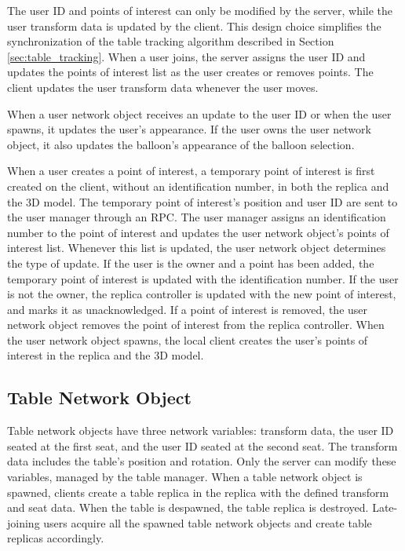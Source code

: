         The user ID and points of interest can only be modified by the server, while the user transform data is updated by the client. This design choice simplifies the synchronization of the table tracking algorithm described in Section \ref{sec:table_tracking}. When a user joins, the server assigns the user ID and updates the points of interest list as the user creates or removes points. The client updates the user transform data whenever the user moves.
        
        When a user network object receives an update to the user ID or when the user spawns, it updates the user's appearance. If the user owns the user network object, it also updates the balloon's appearance of the balloon selection.

        When a user creates a point of interest, a temporary point of interest is first created on the client, without an identification number, in both the replica and the 3D model. The temporary point of interest's position and user ID are sent to the user manager through an RPC. The user manager assigns an identification number to the point of interest and updates the user network object's points of interest list. Whenever this list is updated, the user network object determines the type of update. If the user is the owner and a point has been added, the temporary point of interest is updated with the identification number. If the user is not the owner, the replica controller is updated with the new point of interest, and marks it as unacknowledged. If a point of interest is removed, the user network object removes the point of interest from the replica controller. When the user network object spawns, the local client creates the user's points of interest in the replica and the 3D model.

    \subsection{Table Network Object} \label{sec:table_network}

        Table network objects have three network variables: transform data, the user ID seated at the first seat, and the user ID seated at the second seat. The transform data includes the table's position and rotation. Only the server can modify these variables, managed by the table manager. When a table network object is spawned, clients create a table replica in the replica with the defined transform and seat data. When the table is despawned, the table replica is destroyed. Late-joining users acquire all the spawned table network objects and create table replicas accordingly.

